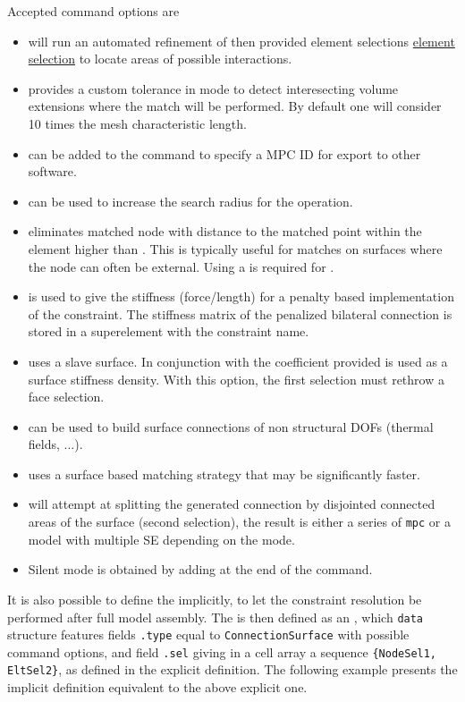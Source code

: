 \begin{SDT}
Accepted command options are 
\begin{itemize}
\item {} will run an automated refinement of then provided element selections \hyperlink{findelt}{element selection} to locate areas of possible interactions.
\item {} provides a custom tolerance in  mode to detect interesecting volume extensions where the match will be performed. By default one will consider 10 times the mesh characteristic length.
\item {} can be added to the command to specify a MPC ID {\ti {}} for export to other software. 
\item {} can be used to increase the search radius for the  operation.
\item {} eliminates matched node with distance to the matched point within the element higher than . This is typically useful for matches on surfaces where the node can often be external. Using a  is required for .
\item {} is used to give the stiffness (force/length) for a penalty based implementation of the constraint. The stiffness matrix of the penalized bilateral connection is stored in a superelement with the constraint name.
\item {} uses  a slave surface. In conjunction with  the coefficient provided is used as a surface stiffness density. With this option, the first selection must rethrow a face selection.
\item {} can be used to build surface connections of non structural DOFs (thermal fields, ...).
\item {} uses a surface based matching strategy that may be significantly faster.
\item {} will attempt at splitting the generated connection by disjointed connected areas of the surface (second selection), the result is either a series of {\tt mpc} or a model with multiple SE depending on the mode.
\item Silent mode is obtained by adding \ts{;} at the end of the command.
\end{itemize}

It is also possible to define the  implicitly, to let the constraint resolution be performed after full model assembly. The  is then defined as an , which {\tt data} structure features fields {\tt .type} equal to {\tt ConnectionSurface} with possible command options, and field {\tt .sel} giving in a cell array a sequence {\tt \{NodeSel1, EltSel2\}}, as defined in the explicit definition. The following example presents the implicit  definition equivalent to the above explicit one.


\end{SDT}
